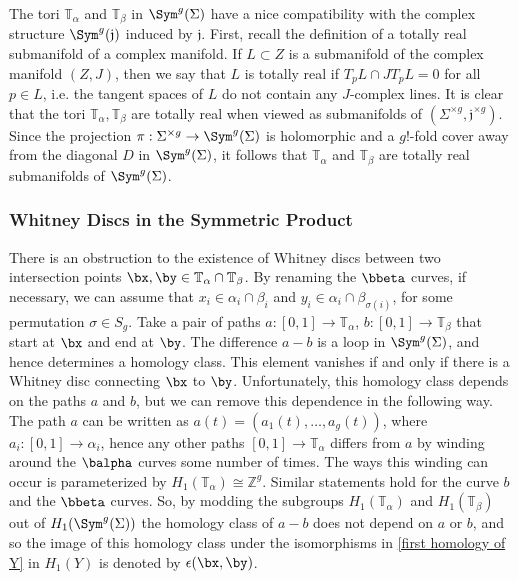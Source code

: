 The tori $\mathbb T_\alpha$ and $\mathbb T_\beta$ in $\Sym^g(\Sigma)$ have a nice compatibility with the complex structure $\Sym^g(\mathfrak j)$ induced by $\mathfrak j$. First, recall the definition of a totally real submanifold of a complex manifold. If $L \subset Z$ is a submanifold of the complex manifold $(Z,J)$, then we say that $L$ is totally real if $T_p L \cap J T_p L = 0$ for all $p \in L$, i.e. the tangent spaces of $L$ do not contain any $J$-complex lines. It is clear that the tori $\mathbb T_\alpha,\mathbb T_\beta$ are totally real when viewed as submanifolds of $(\Sigma^{\times g},\mathfrak j^{\times g})$. Since the projection $\pi : \Sigma^{\times g} \rightarrow \Sym^g(\Sigma)$ is holomorphic and a $g!$-fold cover away from the diagonal $D$ in $\Sym^g(\Sigma)$, it follows that $\mathbb T_\alpha$ and $\mathbb T_\beta$ are totally real submanifolds of $\Sym^g(\Sigma)$.





\subsubsection*{Whitney Discs in the Symmetric Product}

There is an obstruction to the existence of Whitney discs between two intersection points $\bx,\by \in \mathbb T_\alpha \cap \mathbb T_\beta$. By renaming the $\bbeta$ curves, if necessary, we can assume that $x_i \in \alpha_i \cap \beta_i$ and $y_i \in \alpha_i \cap \beta_{\sigma(i)}$, for some permutation $\sigma \in S_g$. Take a pair of paths $a : [0,1] \rightarrow \mathbb T_\alpha$, $b : [0,1] \rightarrow \mathbb T_\beta$ that start at $\bx$ and end at $\by$. The difference $a-b$ is a loop in $\Sym^g(\Sigma)$, and hence determines a homology class. This element vanishes if and only if there is a Whitney disc connecting $\bx$ to $\by$. Unfortunately, this homology class depends on the paths $a$ and $b$, but we can remove this dependence in the following way. The path $a$ can be written as $a(t)=(a_1(t),\ldots,a_g(t))$, where $a_i : [0,1] \rightarrow \alpha_i$, hence any other paths $[0,1] \rightarrow \mathbb T_\alpha$ differs from $a$ by winding around the $\balpha$ curves some number of times. The ways this winding can occur is parameterized by $H_1(\mathbb T_\alpha) \cong \mathbb Z^g$. Similar statements hold for the curve $b$ and the $\bbeta$ curves. So, by modding the subgroups $H_1(\mathbb T_\alpha)$ and $H_1(\mathbb T_\beta)$ out of $H_1(\Sym^g(\Sigma))$ the homology class of $a-b$ does not depend on $a$ or $b$, and so the image of this homology class under the isomorphisms in \cref{first homology of Y} in $H_1(Y)$ is denoted by $\epsilon(\bx,\by)$.

